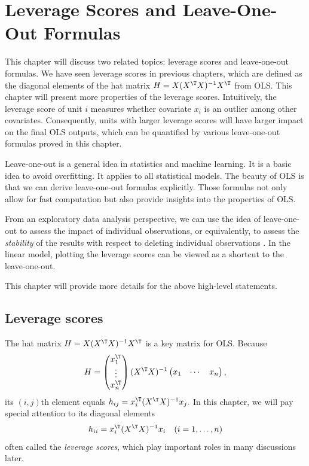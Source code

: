  
\chapter{Leverage Scores and Leave-One-Out Formulas}\label{chapter::leave-one-out}


This chapter will discuss two related topics: leverage scores and leave-one-out formulas. We have seen leverage scores in previous chapters, which are defined as the diagonal elements of the hat matrix  $H=X(X^{\T}X)^{-1}X^{\T} $ from OLS. This chapter will present more properties of the leverage scores. Intuitively, the leverage score of unit $i$ measures whether covariate $x_i$ is an outlier among other covariates. Consequently, units with larger leverage scores will have larger impact on the final OLS outputs, which can be quantified by various leave-one-out formulas proved in this chapter. 

Leave-one-out is a general idea in statistics and machine learning. It is a basic idea to avoid overfitting. It applies to all statistical models. The beauty of OLS is that we can derive leave-one-out formulas explicitly. Those formulas not only allow for fast computation but also provide insights into the properties of OLS. 


From an exploratory data analysis perspective, we can use the idea of leave-one-out to assess the impact of individual observations, or equivalently, to assess the {\it stability} of the results with respect to deleting individual observations \citep{yu2020veridical}. 
In the linear model, plotting the leverage scores can be viewed as a shortcut to the leave-one-out. 

This chapter will provide more details for the above high-level statements. 



 
\section{Leverage scores}

The hat matrix  $H=X(X^{\T}X)^{-1}X^{\T} $ is a key matrix for OLS. Because 
$$
H 
 = \begin{pmatrix}
x_1^{\T} \\
\vdots \\
x_{n}^{\T}
\end{pmatrix} 
(X^{\T}X)^{-1} 
\begin{pmatrix}
x_1& \cdots & x_n
\end{pmatrix},
$$
its $(i,j)$th element equals $h_{ij}=x_{i}^{\T}(X^{\T}X)^{-1}x_{j}  .$
In this chapter, we will pay special attention
to its diagonal elements 
\[
h_{ii}=x_{i}^{\T}(X^{\T}X)^{-1}x_{i}  \quad (i= 1, \ldots, n)
\]
 often called the {\it leverage scores}, which play important roles in many
discussions later. 

